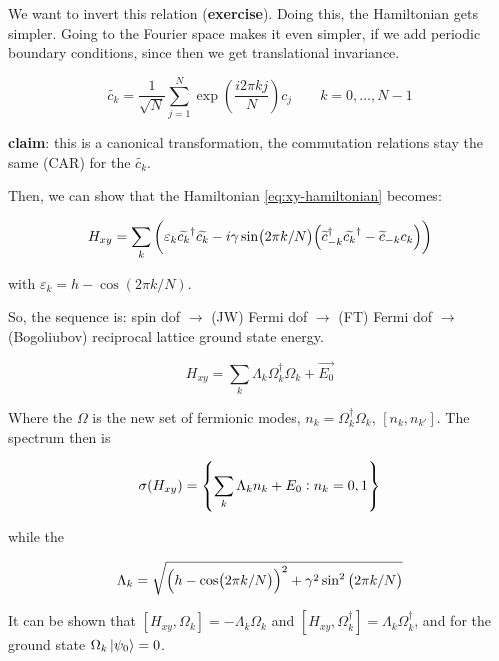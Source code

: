 \documentclass[main_zanardi.tex]{subfiles}
\begin{document}
We want to invert this relation (\textbf{exercise}). Doing this, the Hamiltonian gets simpler. Going to the Fourier space makes it even simpler, if we add periodic boundary conditions, since then we get translational invariance.

\begin{equation}
    \widetilde{c_k} = \frac{1}{\sqrt{N} } \sum _{j=1}   ^{N} \exp(\frac{i 2 \pi k j}{N}) c_j  \qquad k = 0, \dots, N-1
\end{equation}

\textbf{claim}: this is a canonical transformation, the commutation relations stay the same (CAR) for the \(\widetilde{c_k} \).

Then, we can show that the Hamiltonian \eqref{eq:xy-hamiltonian} becomes:

\begin{equation}
    H _{xy} = \sum _k \qty(\varepsilon_k \widetilde{c_k} ^\dag \widetilde{c_k} - i \gamma \sin(2 \pi k/N) \qty(\widetilde{c}_{-k}^\dag \widetilde{c_k}^\dag - \widetilde{c}_{-k} c_k))
\end{equation}

with \(\varepsilon_k = h - \cos(2 \pi k /N)\).

So, the sequence is: spin dof \(\rightarrow\) (JW) Fermi dof \(\rightarrow\) (FT) Fermi dof \(\rightarrow\) (Bogoliubov) reciprocal lattice ground state energy.

\begin{equation}
    H _{xy} = \sum _{k}  \Lambda_k \Omega_k ^\dag \Omega_k + \vec{E_0}
\end{equation}

Where the \(\Omega\) is the new set of fermionic modes, \(n_k = \Omega_k ^\dag \Omega_k\), \([n_ k, n_{k'}]\). The spectrum then is

\begin{equation} \label{eq:xy-spectrum}
    \sigma(H _{xy} ) = \qty{\sum _{k}  \Lambda_k n_k + E_0 :  n_k = 0, 1 }
\end{equation}

while the

\begin{equation}
    \Lambda_k = \sqrt{\qty(h - \cos(2 \pi k /N))^2 + \gamma^2 \sin^2\qty(2 \pi k /N) }
\end{equation}

It can be shown that \([H _{xy}, \Omega_k ] = - \Lambda_k \Omega_k\) and  \([H _{xy}, \Omega_k^\dag ] = \Lambda_k \Omega_k ^\dag\), and for the ground state \(\Omega_k \ket{\psi_0} = 0 \).
\end{document}
